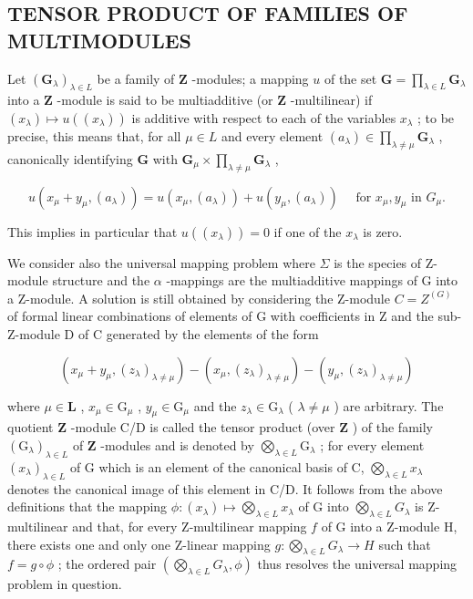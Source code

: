 \subsection{TENSOR PRODUCT OF FAMILIES OF MULTIMODULES}

Let \((\mathbf{G}_{\lambda})_{\lambda \in L}\) be a family of \(\mathbf{Z}\) -modules; a mapping \(u\) of the set \(\mathbf{G} = \prod_{\lambda \in L} \mathbf{G}_{\lambda}\) into a \(\mathbf{Z}\) -module is said to be multiadditive (or \(\mathbf{Z}\) -multilinear) if \((x_{\lambda}) \mapsto u((x_{\lambda}))\) is additive with respect to each of the variables \(x_{\lambda}\) ; to be precise, this means that, for all \(\mu \in L\) and every element \((a_{\lambda}) \in \prod_{\lambda \neq \mu} \mathbf{G}_{\lambda}\) , canonically identifying \(\mathbf{G}\) with \(\mathbf{G}_{\mu} \times \prod_{\lambda \neq \mu} \mathbf{G}_{\lambda}\) ,

\[
u (x _ {\mu} + y _ {\mu}, (a _ {\lambda})) = u (x _ {\mu}, (a _ {\lambda})) + u (y _ {\mu}, (a _ {\lambda})) \quad \text { for } x _ {\mu}, y _ {\mu} \text { in } G _ {\mu}.\tag{24}
\]

This implies in particular that \(u((x_{\lambda})) = 0\) if one of the \(x_{\lambda}\) is zero.

We consider also the universal mapping problem where \(\Sigma\) is the species of Z-module structure and the \(\alpha\) -mappings are the multiadditive mappings of G into a Z-module. A solution is still obtained by considering the Z-module \(C = Z^{(G)}\) of formal linear combinations of elements of G with coefficients in Z and the sub-Z-module D of C generated by the elements of the form

\[
\left(x _ {\mu} + y _ {\mu}, \left(z _ {\lambda}\right) _ {\lambda \neq \mu}\right) - \left(x _ {\mu}, \left(z _ {\lambda}\right) _ {\lambda \neq \mu}\right) - \left(y _ {\mu}, \left(z _ {\lambda}\right) _ {\lambda \neq \mu}\right)
\]

where \(\mu \in \mathbf{L}\) , \(x_{\mu} \in \mathrm{G}_{\mu}\) , \(y_{\mu} \in \mathrm{G}_{\mu}\) and the \(z_{\lambda} \in \mathrm{G}_{\lambda}\) ( \(\lambda \neq \mu\) ) are arbitrary. The quotient \(\mathbf{Z}\) -module C/D is called the tensor product (over \(\mathbf{Z}\) ) of the family \((\mathrm{G}_{\lambda})_{\lambda \in L}\) of \(\mathbf{Z}\) -modules and is denoted by \(\bigotimes_{\lambda \in L} \mathrm{G}_{\lambda}\) ; for every element \((x_{\lambda})_{\lambda \in L}\) of G which is an element of the canonical basis of C, \(\bigotimes_{\lambda \in L} x_{\lambda}\) denotes the canonical image of this element in C/D. It follows from the above definitions that the mapping \(\phi: (x_{\lambda}) \mapsto \bigotimes_{\lambda \in L} x_{\lambda}\) of G into \(\bigotimes_{\lambda \in L} G_{\lambda}\) is Z-multilinear and that, for every Z-multilinear mapping \(f\) of G into a Z-module H, there exists one and only one Z-linear mapping \(g: \bigotimes_{\lambda \in L} G_{\lambda} \to H\) such that \(f = g \circ \phi\) ; the ordered pair \(\left( \bigotimes_{\lambda \in L} G_{\lambda}, \phi \right)\) thus resolves the universal mapping problem in question.

